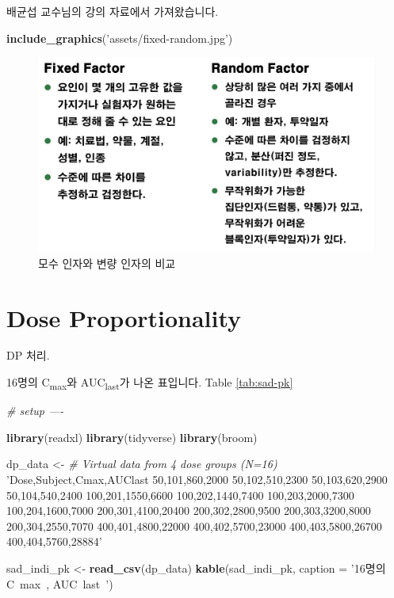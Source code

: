 \documentclass[12pt,]{krantz}
\newenvironment{Shaded}{\begin{snugshade}}{\end{snugshade}}
\newcommand{\KeywordTok}[1]{\textcolor[rgb]{0.13,0.29,0.53}{\textbf{#1}}}
\newcommand{\DataTypeTok}[1]{\textcolor[rgb]{0.13,0.29,0.53}{#1}}
\newcommand{\StringTok}[1]{\textcolor[rgb]{0.31,0.60,0.02}{#1}}
\newcommand{\CommentTok}[1]{\textcolor[rgb]{0.56,0.35,0.01}{\textit{#1}}}
\newcommand{\NormalTok}[1]{#1}
\theoremstyle{definition}
\theoremstyle{definition}
\theoremstyle{definition}
\theoremstyle{remark}
\begin{document}
배균섭 교수님의 강의 자료에서 가져왔습니다.

\begin{Shaded}
\begin{Highlighting}[]
\KeywordTok{include_graphics}\NormalTok{(}\StringTok{'assets/fixed-random.jpg'}\NormalTok{)}
\end{Highlighting}
\end{Shaded}

\begin{figure}
\includegraphics[width=16.86in]{assets/fixed-random} \caption{모수 인자와 변량 인자의 비교}\label{fig:fixedrandom}
\end{figure}

\section{Dose Proportionality}\label{dp}

DP 처리.

16명의 C\textsubscript{max}와 AUC\textsubscript{last}가 나온 표입니다.
Table \ref{tab:sad-pk}

\begin{Shaded}
\begin{Highlighting}[]
\CommentTok{# setup ----}

\KeywordTok{library}\NormalTok{(readxl)}
\KeywordTok{library}\NormalTok{(tidyverse)}
\KeywordTok{library}\NormalTok{(broom)}

\NormalTok{dp_data <-}\StringTok{ }\CommentTok{# Virtual data from 4 dose groups (N=16)}
\StringTok{'Dose,Subject,Cmax,AUClast}
\StringTok{50,101,860,2000}
\StringTok{50,102,510,2300}
\StringTok{50,103,620,2900}
\StringTok{50,104,540,2400}
\StringTok{100,201,1550,6600}
\StringTok{100,202,1440,7400}
\StringTok{100,203,2000,7300}
\StringTok{100,204,1600,7000}
\StringTok{200,301,4100,20400}
\StringTok{200,302,2800,9500}
\StringTok{200,303,3200,8000}
\StringTok{200,304,2550,7070}
\StringTok{400,401,4800,22000}
\StringTok{400,402,5700,23000}
\StringTok{400,403,5800,26700}
\StringTok{400,404,5760,28884'}

\NormalTok{sad_indi_pk <-}\StringTok{ }\KeywordTok{read_csv}\NormalTok{(dp_data)}
\KeywordTok{kable}\NormalTok{(sad_indi_pk, }\DataTypeTok{caption =} \StringTok{'16명의 C~max~, AUC~last~'}\NormalTok{)}
\end{Highlighting}
\end{Shaded}
\end{document}
